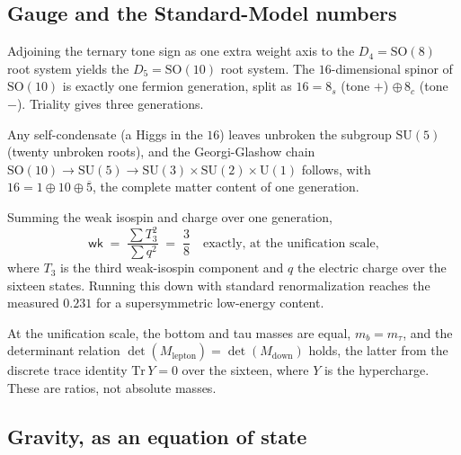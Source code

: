 \subsection{Gauge and the Standard-Model numbers}

\begin{proposition}
Adjoining the ternary tone sign as one extra weight axis to the $D_4 = \mathrm{SO}(8)$ root system yields the
$D_5 = \mathrm{SO}(10)$ root system. The $16$-dimensional spinor of $\mathrm{SO}(10)$ is exactly one fermion
generation, split as $16 = 8_s$ (tone $+$) $\oplus\, 8_c$ (tone $-$). Triality gives three generations.
\end{proposition}

\begin{proposition}
Any self-condensate (a Higgs in the $16$) leaves unbroken the subgroup $\mathrm{SU}(5)$ (twenty unbroken roots),
and the Georgi-Glashow chain $\mathrm{SO}(10) \to \mathrm{SU}(5) \to \mathrm{SU}(3) \times \mathrm{SU}(2) \times
\mathrm{U}(1)$ follows, with $16 = 1 \oplus 10 \oplus \overline{5}$, the complete matter content of one
generation.
\end{proposition}

\begin{result}
Summing the weak isospin and charge over one generation,
\[
\mathsf{wk} \;=\; \frac{\sum T_3^2}{\sum q^2} \;=\; \frac{3}{8} \quad \text{exactly, at the unification scale,}
\]
where $T_3$ is the third weak-isospin component and $q$ the electric charge over the sixteen states. Running this
down with standard renormalization reaches the measured $0.231$ for a supersymmetric low-energy content.
\end{result}

\begin{result}
At the unification scale, the bottom and tau masses are equal, $m_b = m_\tau$, and the determinant relation
$\det(M_{\mathrm{lepton}}) = \det(M_{\mathrm{down}})$ holds, the latter from the discrete trace identity
$\mathrm{Tr}\, Y = 0$ over the sixteen, where $Y$ is the hypercharge. These are ratios, not absolute masses.
\end{result}

\subsection{Gravity, as an equation of state}

